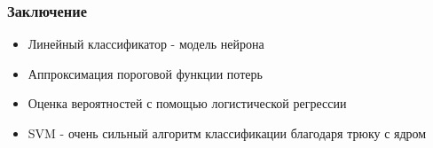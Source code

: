 \documentclass{beamer}
\begin{document}
\begin{frame}
\begin{columns}
\begin{column}[t]{0.5\textwidth}
			\end{column}			
		\end{columns}
	\end{frame}
	
	\begin{frame}
		\frametitle{Заключение}
		
		\begin{itemize}
			\item Линейный классификатор - модель нейрона
			\item Аппроксимация пороговой функции потерь
			\item Оценка вероятностей с помощью логистической регрессии
			\item SVM - очень сильный алгоритм классификации благодаря трюку с ядром
		\end{itemize}
	\end{frame}
\end{document}
